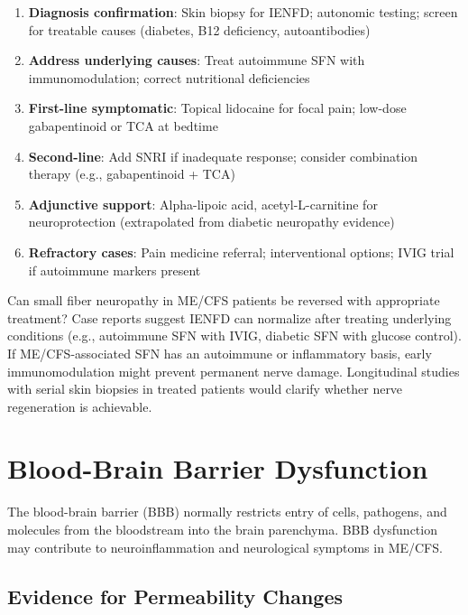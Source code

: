 \begin{enumerate}
    \item \textbf{Diagnosis confirmation}: Skin biopsy for IENFD; autonomic testing; screen for treatable causes (diabetes, B12 deficiency, autoantibodies)
    \item \textbf{Address underlying causes}: Treat autoimmune SFN with immunomodulation; correct nutritional deficiencies
    \item \textbf{First-line symptomatic}: Topical lidocaine for focal pain; low-dose gabapentinoid or TCA at bedtime
    \item \textbf{Second-line}: Add SNRI if inadequate response; consider combination therapy (e.g., gabapentinoid + TCA)
    \item \textbf{Adjunctive support}: Alpha-lipoic acid, acetyl-L-carnitine for neuroprotection (extrapolated from diabetic neuropathy evidence)
    \item \textbf{Refractory cases}: Pain medicine referral; interventional options; IVIG trial if autoimmune markers present
\end{enumerate}

\begin{open_question}
Can small fiber neuropathy in ME/CFS patients be reversed with appropriate treatment? Case reports suggest IENFD can normalize after treating underlying conditions (e.g., autoimmune SFN with IVIG, diabetic SFN with glucose control). If ME/CFS-associated SFN has an autoimmune or inflammatory basis, early immunomodulation might prevent permanent nerve damage. Longitudinal studies with serial skin biopsies in treated patients would clarify whether nerve regeneration is achievable.
\end{open_question}

\section{Blood-Brain Barrier Dysfunction}
\label{sec:bbb}

The blood-brain barrier (BBB) normally restricts entry of cells, pathogens, and molecules from the bloodstream into the brain parenchyma. BBB dysfunction may contribute to neuroinflammation and neurological symptoms in ME/CFS.

\subsection{Evidence for Permeability Changes}

